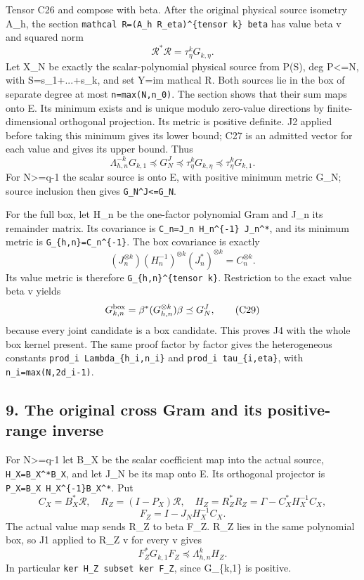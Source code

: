 \documentclass[11pt]{article}
\begin{document}
Tensor C26 and compose with beta. After the original physical source isometry A\_h, the section \texttt{mathcal\ R=(A\_h\ R\_eta)\^{}\{tensor\ k\}\ beta} has value beta v and squared norm \[
\mathcal R^*\mathcal R=\tau_\eta^kG_{k,\eta}.
\tag{C27}
\] Let X\_N be exactly the scalar-polynomial physical source from P(S), deg P\textless=N, with S=s\_1+...+s\_k, and set Y=im mathcal R. Both sources lie in the box of separate degree at most \texttt{n=max(N,n\_0)}. The section shows that their sum maps onto E. Its minimum exists and is unique modulo zero-value directions by finite-dimensional orthogonal projection. Its metric is positive definite. J2 applied before taking this minimum gives its lower bound; C27 is an admitted vector for each value and gives its upper bound. Thus \[
\Lambda_{h,n}^{-k}G_{k,1}\preceq G_N^J
\preceq\tau_\eta^kG_{k,\eta}\preceq\tau_\eta^kG_{k,1}.
\tag{C28}
\] For N\textgreater=q-1 the scalar source is onto E, with positive minimum metric G\_N; source inclusion then gives \texttt{G\_N\^{}J\textless{}=G\_N}.

For the full box, let H\_n be the one-factor polynomial Gram and J\_n its remainder matrix. Its covariance is \texttt{C\_n=J\_n\ H\_n\^{}\{-1\}\ J\_n\^{}*}, and its minimum metric is \texttt{G\_\{h,n\}=C\_n\^{}\{-1\}}. The box covariance is exactly \[
(J_n^{\otimes k})(H_n^{-1})^{\otimes k}(J_n^*)^{\otimes k}
=C_n^{\otimes k}.
\] Its value metric is therefore \texttt{G\_\{h,n\}\^{}\{tensor\ k\}}. Restriction to the exact value beta v yields \[
G_{k,n}^{\rm box}=\beta^*(G_{h,n}^{\otimes k})\beta\preceq G_N^J,
\tag{C29}
\] because every joint candidate is a box candidate. This proves J4 with the whole box kernel present. The same proof factor by factor gives the heterogeneous constants \texttt{prod\_i\ Lambda\_\{h\_i,n\_i\}} and \texttt{prod\_i\ tau\_\{i,eta\}}, with \texttt{n\_i=max(N,2d\_i-1)}.

\subsection{9. The original cross Gram and its positive-range inverse}\label{mrcoerc:the-original-cross-gram-and-its-positive-range-inverse}

For N\textgreater=q-1 let B\_X be the scalar coefficient map into the actual source, \texttt{H\_X=B\_X\^{}*B\_X}, and let J\_N be its map onto E. Its orthogonal projector is \texttt{P\_X=B\_X\ H\_X\^{}\{-1\}B\_X\^{}*}. Put \[
C_X=B_X^*\mathcal R,\quad
R_Z=(I-P_X)\mathcal R,\quad
H_Z=R_Z^*R_Z=\Gamma-C_X^*H_X^{-1}C_X,
\] \[
F_Z=I-J_NH_X^{-1}C_X.
\tag{C30}
\] The actual value map sends R\_Z to beta F\_Z. R\_Z lies in the same polynomial box, so J1 applied to R\_Z v for every v gives \[
F_Z^*G_{k,1}F_Z\preceq\Lambda_{h,n}^kH_Z.
\tag{C31}
\] In particular \texttt{ker\ H\_Z\ subset\ ker\ F\_Z}, since G\_\{k,1\} is positive.
\end{document}
